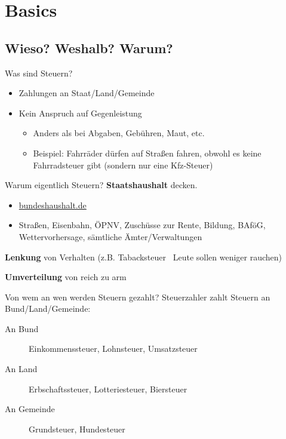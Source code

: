 \documentclass{beamer}
\newcommand{\n}{\hfill\\\vspace{0.25cm}}
\begin{document}
	\begin{frame}
		\tableofcontents[hidesubsections]
	\end{frame}
	
	\section{Basics}
	
		\begin{frame}
		\end{frame}
	
		\subsection{Wieso? Weshalb? Warum?}
	
			\begin{frame}{Was sind Steuern?}
				\begin{itemize}
					\item Zahlungen an Staat/Land/Gemeinde
					\item Kein Anspruch auf Gegenleistung
					\begin{itemize}
						\item Anders als bei Abgaben, Gebühren, Maut, etc.
						\item Beispiel: Fahrräder dürfen auf Straßen fahren, obwohl es keine Fahrradsteuer gibt (sondern nur eine Kfz-Steuer)
					\end{itemize}
				\end{itemize}
			\end{frame}
		
			\begin{frame}{Warum eigentlich Steuern?}
				\textbf{Staatshaushalt} decken.
				\begin{itemize}
					\item \href{https://www.bundeshaushalt.de/DE/Bundeshaushalt-digital/bundeshaushalt-digital.html}{bundeshaushalt.de}
					\item Straßen, Eisenbahn, ÖPNV, Zuschüsse zur Rente, Bildung, BAföG, Wettervorhersage, sämtliche Ämter/Verwaltungen
				\end{itemize}
			
				\textbf{Lenkung} von Verhalten (z.B. Tabacksteuer \textrightarrow\ Leute sollen weniger rauchen)
				
				\textbf{Umverteilung} von reich zu arm
			\end{frame}
		
			\begin{frame}{Von wem an wen werden Steuern gezahlt?}
				Steuerzahler zahlt Steuern an Bund/Land/Gemeinde:\n
				
				\begin{description}
					\item[An Bund] Einkommenssteuer, Lohnsteuer, Umsatzsteuer
					\item[An Land] Erbschaftssteuer, Lotteriesteuer, Biersteuer
					\item[An Gemeinde] Grundsteuer, Hundesteuer
				\end{description}
			\end{frame}
		
\end{document}
